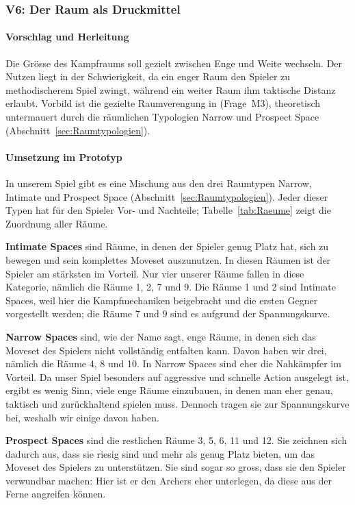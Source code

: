 \documentclass[../Main.tex]{subfiles}
\begin{document}
\subsubsection{V6: Der Raum als Druckmittel} \label{sec:V6}

\paragraph{Vorschlag und Herleitung}
Die Grösse des Kampfraums soll gezielt zwischen Enge und Weite wechseln. Der Nutzen liegt in der Schwierigkeit, da ein enger Raum den Spieler zu methodischerem Spiel zwingt, während ein weiter Raum ihm taktische Distanz erlaubt. Vorbild ist die gezielte Raumverengung in  (Frage~M3), theoretisch untermauert durch die räumlichen Typologien Narrow und Prospect Space (Abschnitt~\ref{sec:Raumtypologien}).

\paragraph{Umsetzung im Prototyp}
In unserem Spiel gibt es eine Mischung aus den drei Raumtypen Narrow, Intimate und Prospect Space (Abschnitt~\ref{sec:Raumtypologien}). Jeder dieser Typen hat für den Spieler Vor- und Nachteile; Tabelle~\ref{tab:Raeume} zeigt die Zuordnung aller Räume.

\textbf{Intimate Spaces} sind Räume, in denen der Spieler genug Platz hat, sich zu bewegen und sein komplettes Moveset auszunutzen. In diesen Räumen ist der Spieler am stärksten im Vorteil. Nur vier unserer Räume fallen in diese Kategorie, nämlich die Räume 1, 2, 7 und 9. Die Räume 1 und 2 sind Intimate Spaces, weil hier die Kampfmechaniken beigebracht und die ersten Gegner vorgestellt werden; die Räume 7 und 9 sind es aufgrund der Spannungskurve.

\textbf{Narrow Spaces} sind, wie der Name sagt, enge Räume, in denen sich das Moveset des Spielers nicht vollständig entfalten kann. Davon haben wir drei, nämlich die Räume 4, 8 und 10. In Narrow Spaces sind eher die Nahkämpfer im Vorteil. Da unser Spiel besonders auf aggressive und schnelle Action ausgelegt ist, ergibt es wenig Sinn, viele enge Räume einzubauen, in denen man eher genau, taktisch und zurückhaltend spielen muss. Dennoch tragen sie zur Spannungskurve bei, weshalb wir einige davon haben.

\textbf{Prospect Spaces} sind die restlichen Räume 3, 5, 6, 11 und 12. Sie zeichnen sich dadurch aus, dass sie riesig sind und mehr als genug Platz bieten, um das Moveset des Spielers zu unterstützen. Sie sind sogar so gross, dass sie den Spieler verwundbar machen: Hier ist er den Archers eher unterlegen, da diese aus der Ferne angreifen können.
\end{document}
